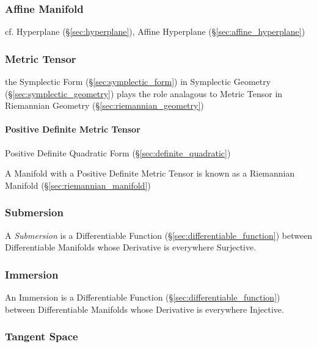 \subsubsection{Affine Manifold}\label{sec:affine_manifold}

cf. Hyperplane (\S\ref{sec:hyperplane}), Affine Hyperplane
(\S\ref{sec:affine_hyperplane})



\subsubsection{Metric Tensor}\label{sec:metric_tensor}

the Symplectic Form (\S\ref{sec:symplectic_form}) in Symplectic Geometry
(\S\ref{sec:symplectic_geometry}) plays the role analagous to Metric Tensor in
Riemannian Geometry (\S\ref{sec:riemannian_geometry})



\paragraph{Positive Definite Metric Tensor}
\label{sec:positive_definite_metric_tensor}\hfill

Positive Definite Quadratic Form (\S\ref{sec:definite_quadratic})

A Manifold with a Positive Definite Metric Tensor is known as a
Riemannian Manifold (\S\ref{sec:riemannian_manifold})



\subsubsection{Submersion}\label{sec:submersion}

A \emph{Submersion} is a Differentiable Function
(\S\ref{sec:differentiable_function}) between Differentiable Manifolds
whose Derivative is everywhere Surjective.



\subsubsection{Immersion}\label{sec:immersion}

An Immersion is a Differentiable Function
(\S\ref{sec:differentiable_function}) between Differentiable Manifolds
whose Derivative is everywhere Injective.



\subsubsection{Tangent Space}\label{sec:tangent_space}

